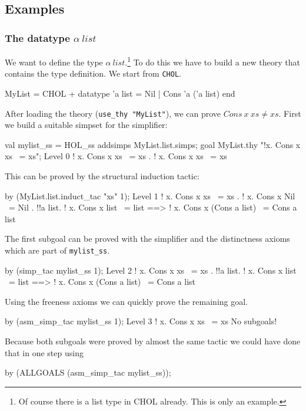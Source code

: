 \subsection{Examples}

\subsubsection{The datatype $\alpha~list$}

We want to define the type $\alpha~list$.\footnote{Of course there is a list
  type in CHOL already. This is only an example.} To do this we have to build
a new theory that contains the type definition. We start from {\tt CHOL}.
\begin{ttbox}
MyList = CHOL +
  datatype 'a list = Nil | Cons 'a ('a list)
end
\end{ttbox}
After loading the theory (\verb$use_thy "MyList"$), we can prove
$Cons~x~xs\neq xs$.  First we build a suitable simpset for the simplifier:
\begin{ttbox}
val mylist_ss = HOL_ss addsimps MyList.list.simps;
goal MyList.thy "!x. Cons x xs ~= xs";
{\out Level 0}
{\out ! x. Cons x xs ~= xs}
{. ! x. Cons x xs ~= xs}
\end{ttbox}
This can be proved by the structural induction tactic:
\begin{ttbox}
by (MyList.list.induct_tac "xs" 1);
{\out Level 1}
{\out ! x. Cons x xs ~= xs}
{. ! x. Cons x Nil ~= Nil}
{. !!a list.}
{\out        ! x. Cons x list ~= list ==>}
{\out        ! x. Cons x (Cons a list) ~= Cons a list}
\end{ttbox}
The first subgoal can be proved with the simplifier and the distinctness
axioms which are part of \verb$mylist_ss$.
\begin{ttbox}
by (simp_tac mylist_ss 1);
{\out Level 2}
{\out ! x. Cons x xs ~= xs}
{. !!a list.}
{\out        ! x. Cons x list ~= list ==>}
{\out        ! x. Cons x (Cons a list) ~= Cons a list}
\end{ttbox}
Using the freeness axioms we can quickly prove the remaining goal.
\begin{ttbox}
by (asm_simp_tac mylist_ss 1);
{\out Level 3}
{\out ! x. Cons x xs ~= xs}
{\out No subgoals!}
\end{ttbox}
Because both subgoals were proved by almost the same tactic we could have
done that in one step using
\begin{ttbox}
by (ALLGOALS (asm_simp_tac mylist_ss));
\end{ttbox}


